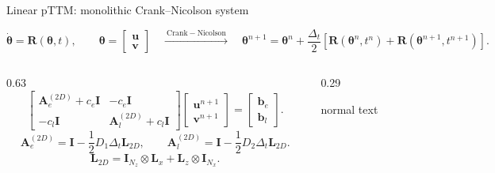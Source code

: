 \documentclass[aspectratio=169,10pt]{beamer}
\begin{document}
\begin{frame}[t]{Linear pTTM: monolithic Crank--Nicolson system}
  \vspace{-0.16cm}
  \begin{center}
    \scriptsize
    \[
      \dot{\boldsymbol{\theta}}=\mathbf{R}(\boldsymbol{\theta},t),
      \qquad
      \boldsymbol{\theta}=
      \begin{bmatrix}\mathbf u\\\mathbf v\end{bmatrix}
      \quad
      \xrightarrow{\ \mathrm{Crank\!-\!Nicolson}\ }\quad
      \boldsymbol{\theta}^{n+1}
      =
      \boldsymbol{\theta}^{n}
      +
      \frac{\Delta_t}{2}
      \left[
        \mathbf{R}(\boldsymbol{\theta}^{n},t^n)
        +
        \mathbf{R}(\boldsymbol{\theta}^{n+1},t^{n+1})
      \right].
    \]
  \end{center}
  \vspace{-0.20cm}
  \begin{columns}[T,totalwidth=0.96\textwidth]
    \begin{column}{0.63\textwidth}
      \centering
      \normalsize
      \[
        \begin{bmatrix}
          \mathbf A_e^{(2D)}+c_e\mathbf I & -c_e\mathbf I\\[0.15em]
          -c_l\mathbf I & \mathbf A_l^{(2D)}+c_l\mathbf I
        \end{bmatrix}
        \begin{bmatrix}
          \mathbf u^{n+1}\\[0.15em]
          \mathbf v^{n+1}
        \end{bmatrix}
        =
        \begin{bmatrix}
          \mathbf b_e\\[0.15em]
          \mathbf b_l
        \end{bmatrix}.
      \]
      \vspace{-0.12cm}
      \scriptsize
      \[
        \mathbf A_e^{(2D)}=\mathbf I-\frac12D_1\Delta_t\mathbf L_{2D},
        \qquad
        \mathbf A_l^{(2D)}=\mathbf I-\frac12D_2\Delta_t\mathbf L_{2D}.
      \]
      \vspace{-0.22cm}
      \[
        \mathbf L_{2D}=\mathbf I_{N_z}\otimes\mathbf L_x+\mathbf L_z\otimes\mathbf I_{N_x}.
      \]
    \end{column}
    \begin{column}{0.29\textwidth}
      \begin{beamercolorbox}[wd=\linewidth,sep=0.46em]{normal text}

\end{beamercolorbox}
\end{column}
\end{columns}
\end{frame}
\end{document}
